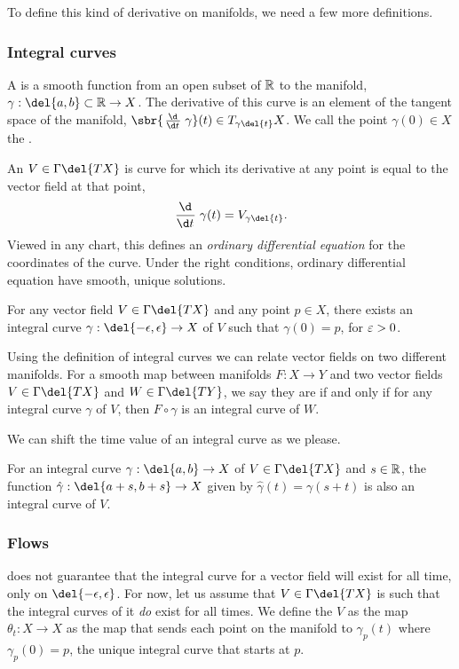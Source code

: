 To define this kind of derivative on manifolds, we need a few more definitions.

\subsubsection{Integral curves}

A  is a smooth function from an open subset of \(\mathbb{R}\) to the manifold, \(\gamma: \del{a,b} \subset \R \to X\).
The derivative of this curve is an element of the tangent space of the manifold, \(\sbr{\od{}{t} \gamma}(t) \in T_{\gamma\del{t}}X\).
We call the point \(\gamma(0) \in X\) the .

An  \(V\in \Gamma\del{TX}\) is curve for which its derivative at any point is equal to the vector field at that point, 
\[
	\od{}{t}\gamma(t) = V_{\gamma\del{t}}
.\] 
Viewed in any chart, this defines an \emph{ordinary differential equation} for the coordinates of the curve.
Under the right conditions, ordinary differential equation have smooth, unique solutions.
\begin{theorem}
	\label{thm:existence_int_curve}
	For any vector field \(V\in \Gamma\del{TX}\) and any point \(p\in X\), there exists an integral curve \(\gamma: \del{-\epsilon, \epsilon} \to X\) of \(V\) such that \(\gamma(0) = p\), for \(\varepsilon > 0\).
\end{theorem}

Using the definition of integral curves we can relate vector fields on two different manifolds.
For a smooth map between manifolds \(F: X \to Y\) and two vector fields \(V \in \Gamma\del{TX}\) and \(W\in \Gamma\del{TY}\), we say they are  if and only if for any integral curve \(\gamma\) of \(V\), then \(F\circ \gamma\) is an integral curve of \(W\).

We can shift the time value of an integral curve as we please.
\begin{lemma}
	\label{lemma:integral_curve_translation}
	For an integral curve \(\gamma: \del{a, b}\to X\) of \(V\in \Gamma\del{TX}\) and \(s\in \mathbb{R}\), the function \(\hat\gamma: \del{a+s, b+s}\to X\) given by \(\hat\gamma(t) = \gamma(s + t)\) is also an integral curve of \(V\).
\end{lemma}

\subsubsection{Flows}
 does not guarantee that the integral curve for a vector field will exist for all time, only on \(\del{-\epsilon, \epsilon}\).
For now, let us assume that \(V\in \Gamma\del{TX}\) is such that the integral curves of it \emph{do} exist for all times.
We define the  \(V\) as the map \(\theta_t: X \to X\) as the map that sends each point on the manifold to \(\gamma_p(t)\) where \(\gamma_p(0) = p\), the unique integral curve that starts at \(p\).

